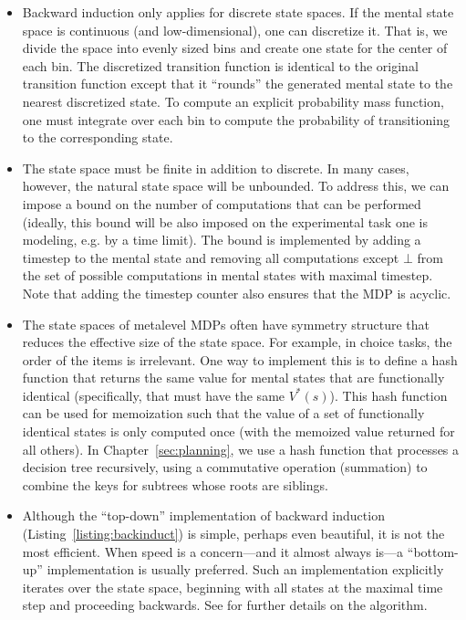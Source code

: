 \begin{itemize}
  \item Backward induction only applies for discrete state spaces. If the mental state space is continuous (and low-dimensional), one can discretize it. That is, we divide the space into evenly sized bins and create one state for the center of each bin. The discretized transition function is identical to the original transition function except that it ``rounds'' the generated mental state to the nearest discretized state. To compute an explicit probability mass function, one must integrate over each bin to compute the probability of transitioning to the corresponding state.
  \item The state space must be finite in addition to discrete. In many cases, however, the natural state space will be unbounded. To address this, we can impose a bound on the number of computations that can be performed (ideally, this bound will be also imposed on the experimental task one is modeling, e.g. by a time limit). The bound is implemented by adding a timestep to the mental state and removing all computations except $\bot$ from the set of possible computations in mental states with maximal timestep. Note that adding the timestep counter also ensures that the MDP is acyclic.
  \item The state spaces of metalevel MDPs often have symmetry structure that reduces the effective size of the state space. For example, in choice tasks, the order of the items is irrelevant. One way to implement this is to define a hash function that returns the same value for mental states that are functionally identical (specifically, that must have the same $V^*(s)$). This hash function can be used for memoization such that the value of a set of functionally identical states is only computed once (with the memoized value returned for all others). In Chapter~\ref{sec:planning}, we use a hash function that processes a decision tree recursively, using a commutative operation (summation) to combine the keys for subtrees whose roots are siblings.
  \item Although the ``top-down'' implementation of backward induction (Listing~\ref{listing:backinduct}) is simple, perhaps even beautiful, it is not the most efficient. When speed is a concern---and it almost always is---a ``bottom-up'' implementation is usually preferred. Such an implementation explicitly iterates over the state space, beginning with all states at the maximal time step and proceeding backwards. See \citet{puterman2014markov} for further details on the algorithm.
\end{itemize}


